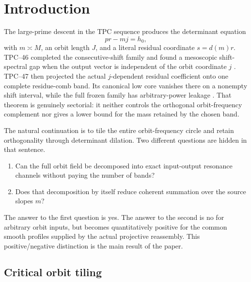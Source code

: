 \section{Introduction}
\label{sec:tpc48-introduction}

The large-prime descent in the TPC sequence produces the determinant
equation
\begin{equation}
 pr-mj=h_0,
 \label{eq:tpc48-intro-determinant}
\end{equation}
with \(m\asymp M\), an orbit length \(J\), and a literal residual
coordinate \(s=d(m)r\).  TPC--46 completed the consecutive-shift
family and found a mesoscopic shift-spectral gap when the output vector
is independent of the orbit coordinate \(j\) \citep{WangTPC46}.
TPC--47 then projected the actual \(j\)-dependent residual coefficient
onto one complete residue-comb band.  Its canonical low core vanishes
there on a nonempty shift interval, while the full frozen family has
arbitrary-power leakage \citep{WangTPC47}.  That theorem is genuinely
sectorial: it neither controls the orthogonal orbit-frequency
complement nor gives a lower bound for the mass retained by the chosen
band.

The natural continuation is to tile the entire orbit-frequency circle
and retain orthogonality through determinant dilation.  Two different
questions are hidden in that sentence.
\begin{enumerate}[label=\textup{(\roman*)},leftmargin=2.4em]
 \item Can the full orbit field be decomposed into exact input-output
       resonance channels without paying the number of bands?
 \item Does that decomposition by itself reduce coherent summation over
       the source slopes \(m\)?
\end{enumerate}
The answer to the first question is yes.  The answer to the second is
no for arbitrary orbit inputs, but becomes quantitatively positive for
the common smooth profiles supplied by the actual projective
reassembly.  This positive/negative distinction is the main result of
the paper.

\subsection{Critical orbit tiling}

